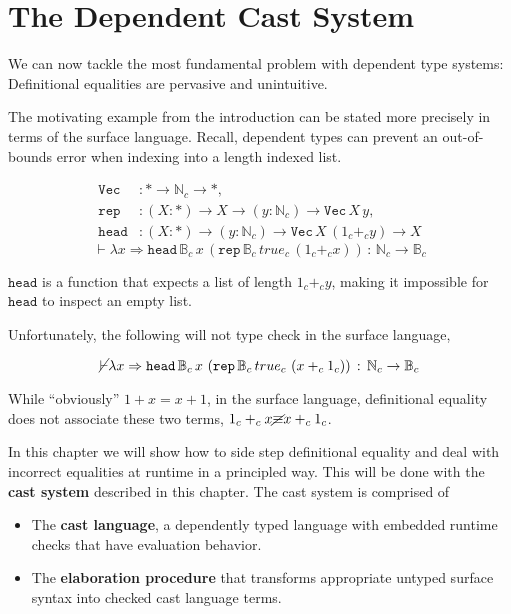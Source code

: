 \chapter{The Dependent Cast System}
\label{chapter:Cast}
\thispagestyle{myheadings}

We can now tackle the most fundamental problem with dependent type systems: Definitional equalities are pervasive and unintuitive.

The motivating example from the introduction can be stated more precisely in terms of the surface language.
Recall, dependent types can prevent an out-of-bounds error when indexing into a length indexed list.
 
\begin{align*}
\mathtt{Vec} & :*\rightarrow\mathbb{N}_{c}\rightarrow*,\\
\mathtt{rep} & :\left(X:*\right)\rightarrow X\rightarrow\left(y:\mathbb{N}_{c}\right)\rightarrow\mathtt{Vec\,}X\,y,\\
\mathtt{head} & :\left(X:*\right)\rightarrow\left(y:\mathbb{N}_{c}\right)\rightarrow\mathtt{Vec}\,X\,\left(1_{c}+_{c}y\right)\rightarrow X
\end{align*}
\[
\vdash\lambda x\Rightarrow\mathtt{head}\,\mathbb{B}_{c}\,x\,\left(\mathtt{rep}\,\mathbb{B}_{c}\,true_{c}\,\left(1_{c}+_{c}x\right)\right)\,:\,\mathbb{N}_{c}\rightarrow\mathbb{B}_{c}
\]
 
$\mathtt{head}$ is a function that expects a list of length $1_{c}+_{c}y$, making it impossible for $\mathtt{head}$ to inspect an empty list.
 
Unfortunately, the following will not type check in the surface language,
 
\[
\cancel{\vdash}\lambda x\Rightarrow\mathtt{head}\,\mathbb{B}_{c}\,x\,\left(\mathtt{rep}\,\mathbb{B}_{c}\,true_{c}\,\left(x+_{c}1_{c}\right)\right)\,:\,\mathbb{N}_{c}\rightarrow\mathbb{B}_{c}
\]
 
\sloppy While ``obviously'' $1+x=x+1$, in the surface language, definitional equality does not associate these two terms, $1_{c}+_{c}x\cancel{\equiv}x+_{c}1_{c}$.
 
In this chapter we will show how to side step definitional equality and deal with incorrect equalities at runtime in a principled way.
This will be done with the \textbf{cast system} described in this chapter.
The cast system is comprised of
\begin{itemize}
\item The \textbf{cast language}, a dependently typed language with embedded runtime checks that have evaluation behavior.
\item The \textbf{elaboration procedure} that transforms appropriate untyped surface syntax into checked cast language terms.
\end{itemize}
 
